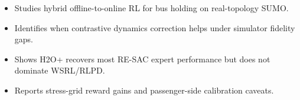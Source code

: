 \begin{itemize}
\item Studies hybrid offline-to-online RL for bus holding on real-topology SUMO.
\item Identifies when contrastive dynamics correction helps under simulator fidelity gaps.
\item Shows H2O+ recovers most RE-SAC expert performance but does not dominate WSRL/RLPD.
\item Reports stress-grid reward gains and passenger-side calibration caveats.
\end{itemize}
